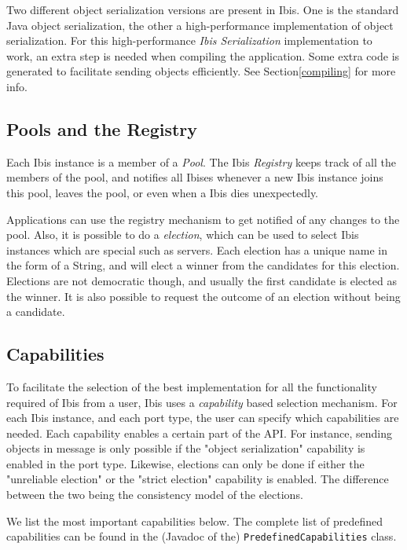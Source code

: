 \documentclass[10pt]{article}
\begin{document}
Two different object serialization versions are present in Ibis.  One is
the standard Java object serialization, the other a high-performance
implementation of object serialization. For this high-performance
\emph{Ibis Serialization} implementation to work, an extra step is needed
when compiling the application. Some extra code is generated to
facilitate sending objects efficiently. See Section\ref{compiling} for
more info.

\subsection{Pools and the Registry}


Each Ibis instance is a member of a \emph{Pool}. The Ibis
\emph{Registry} keeps track of all the members of the pool, and notifies
all Ibises whenever a new Ibis instance joins this pool, leaves the
pool, or even when a Ibis dies unexpectedly.

Applications can use the registry mechanism to get notified of any
changes to the pool. Also, it is possible to do a \emph{election}, which
can be used to select Ibis instances which are special such as servers.
Each election has a unique name in the form of a String, and will elect
a winner from the candidates for this election. Elections are not
democratic though, and usually the first candidate is elected as the
winner. It is also possible to request the outcome of an election
without being a candidate. 

\subsection{Capabilities}

To facilitate the selection of the best implementation for all the
functionality required of Ibis from a user, Ibis uses a
\emph{capability} based selection mechanism. For each Ibis instance, and
each port type, the user can specify which capabilities are needed. Each
capability enables a certain part of the API. For instance, sending
objects in message is only possible if the "object serialization"
capability is enabled in the port type. Likewise, elections can only be
done if either the "unreliable election" or the "strict election"
capability is enabled. The difference between the two being the
consistency model of the elections. 

We list the most important capabilities below. The complete list of
predefined capabilities can be found in the (Javadoc of the)
\texttt{PredefinedCapabilities} class.
\end{document}
